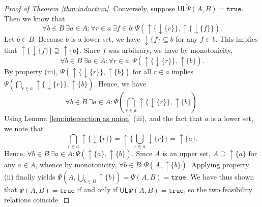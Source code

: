 \documentclass[12pt]{article}
\theoremstyle{definition}
\theoremstyle{plain}
\theoremstyle{plain}
\theoremstyle{plain}
\theoremstyle{plain}
\theoremstyle{remark}
\theoremstyle{remark}
\newcommand{\sub}{\subseteq}
\newcommand{\low}{\mathsf{L}}
\newcommand{\upper}{\mathsf{U}}
\newcommand{\true}{\mathtt{true}}
\newcommand{\upc}[1]{{\uparrow #1}}
\newcommand{\lwc}[1]{{\downarrow #1}}
\begin{document}
\begin{proof}[Proof of Theorem \ref{thm:induction}]
	Conversely, suppose $\upper\low\tilde\Psi(A,B) = \true$. Then we know that
	$$\forall b \in B \: \exists a \in A : \forall r \in a \: \exists f \in b: \Psi(\upc\{\lwc{\{r\}}\},\upc\{\lwc{\{f\}}\}).$$
	Let $b \in B$. Because $b$ is a lower set, we have $\lwc{\{f\}} \sub b$ for any $f \in b$. This implies that $\upc\{ \lwc{\{f\}} \} \supseteq \upc\{b\}$. Since $f$ was arbitrary, we have by monotonicity,
	$$\forall b \in B \: \exists a \in A : \forall r \in a : \Psi(\upc\{\lwc{\{r\}}\},\upc\{b\}).$$
	By property (iii), $\Psi(\upc\{\lwc{\{r\}}\},\upc\{b\})$ for all $r \in a$ implies $\Psi(\bigcap_{r \in a}\upc\{\lwc{\{r\}}\},\upc\{b\})$. Hence, we have  
	$$\forall b \in B \: \exists a \in A : \Psi(\bigcap_{r \in a}\upc\{\lwc{\{r\}}\},\upc\{b\}).$$
	Using Lemma \ref{lem:intersection as union} (iii), and the fact that $a$ is a lower set, we note that $$\bigcap_{r \in a}\upc\{\lwc{\{r\}}\} = \upc{ \{ \bigcup_{r \in a}\lwc{ \{r\} } \}} = \upc \{ a \}.$$
	Hence, $\forall b \in B \: \exists a \in A : \Psi(\upc\{a\},\upc\{b\}).$
	Since $A$ is an upper set, $A \supseteq \upc\{a\}$ for any $a \in A$, whence by monotonicity, $\forall b \in B : \Psi(A,\upc\{b\})$. Applying property (ii) finally yields $\Psi(A,\bigcup_{b \in B}\upc\{b\}) = \Psi(A,B) = \true$. We have thus shown that $\Psi(A,B) = \true$ if and only if $\upper\low\tilde\Psi(A,B) = \true$, so the two feasibility relations coincide.	
\end{proof}
\end{document}
